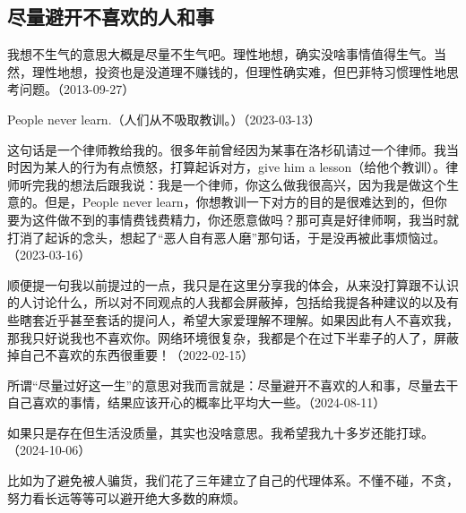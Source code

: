 \subsection{尽量避开不喜欢的人和事}


我想不生气的意思大概是尽量不生气吧。理性地想，确实没啥事情值得生气。当然，理性地想，投资也是没道理不赚钱的，但理性确实难，但巴菲特习惯理性地思考问题。（2013-09-27）


People never learn.（人们从不吸取教训。）（2023-03-13）

这句话是一个律师教给我的。很多年前曾经因为某事在洛杉矶请过一个律师。我当时因为某人的行为有点愤怒，打算起诉对方，give him a lesson（给他个教训）。律师听完我的想法后跟我说：我是一个律师，你这么做我很高兴，因为我是做这个生意的。但是，People never learn，你想教训一下对方的目的是很难达到的，但你要为这件做不到的事情费钱费精力，你还愿意做吗？那可真是好律师啊，我当时就打消了起诉的念头，想起了“恶人自有恶人磨”那句话，于是没再被此事烦恼过。（2023-03-16）

顺便提一句我以前提过的一点，我只是在这里分享我的体会，从来没打算跟不认识的人讨论什么，所以对不同观点的人我都会屏蔽掉，包括给我提各种建议的以及有些瞎套近乎甚至套话的提问人，希望大家爱理解不理解。如果因此有人不喜欢我，那我只好说我也不喜欢你。网络环境很复杂，我都是个在过下半辈子的人了，屏蔽掉自己不喜欢的东西很重要！（2022-02-15）


所谓“尽量过好这一生”的意思对我而言就是：尽量避开不喜欢的人和事，尽量去干自己喜欢的事情，结果应该开心的概率比平均大一些。（2024-08-11）


如果只是存在但生活没质量，其实也没啥意思。我希望我九十多岁还能打球。（2024-10-06）


比如为了避免被人骗货，我们花了三年建立了自己的代理体系。不懂不碰，不贪，努力看长远等等可以避开绝大多数的麻烦。


